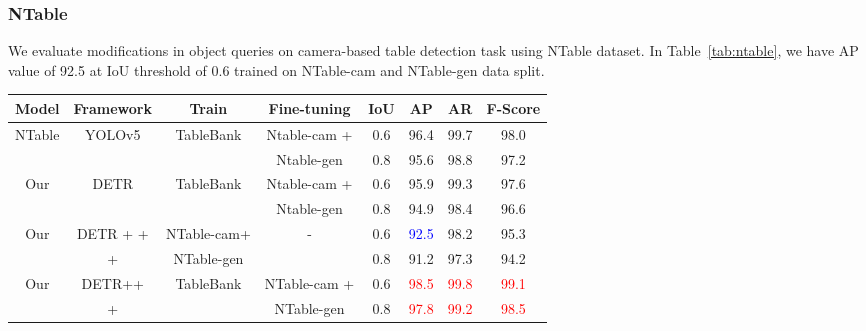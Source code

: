 \documentclass[sn-mathphys]{sn-jnl}\jyear{2021}\theoremstyle{thmstyleone}\newtheorem{theorem}{Theorem}\newtheorem{proposition}[theorem]{Proposition}\theoremstyle{thmstyletwo}\newtheorem{example}{Example}\newtheorem{remark}{Remark}\theoremstyle{thmstylethree}\newtheorem{definition}{Definition}\usepackage{amsmath}
\begin{document}
\subsubsection{NTable}
\label{sec:NTables-result}
We evaluate modifications in object queries on camera-based table detection task using NTable dataset. In Table~\ref{tab:ntable}, we have AP value of 92.5 at IoU threshold of 0.6 trained on NTable-cam and NTable-gen data split. 
\begin{table*}[htp!]
\tiny
\begin{center}
\caption{Comparison between the transformer-based detectors and previous state-of-the-art results on NTable dataset \colorbox{red!25}{without pre-processing} (raw data). Here, term  represents object queries as anchor boxes,  denotes object queries with positive noise and  indicates object queries with negative noise. The best results are exhibited.}\label{tab:ntable}\begin{tabular*}{\textwidth}
{@{\extracolsep{\fill}}cccccccc@{\extracolsep{\fill}}}
\toprule
\textbf{Model} &
\textbf{Framework} &
\textbf{Train} &
\textbf{Fine-tuning} &
\textbf{IoU} &
\textbf{AP} &
\textbf{AR} &
\textbf{F-Score} \\
\midrule

\multirow{2}{*}{NTable \cite{NTables}} & \multirow{2}{*}{YOLOv5} & \multirow{2}{*}{TableBank} & Ntable-cam +  & 0.6 & 96.4 & 99.7 & 98.0 \\
&  &  & Ntable-gen & 0.8 & 95.6 & 98.8 & 97.2\\
\midrule

\multirow{2}{*}{Our} & \multirow{2}{*}{DETR} & \multirow{2}{*}{TableBank} & Ntable-cam +  & 0.6 & 95.9 & 99.3 & 97.6 \\
&  &  & Ntable-gen & 0.8 & 94.9 & 98.4 & 96.6\\
\midrule

\multirow{2}{*}{Our} & DETR + +  & NTable-cam+  & \multirow{2}{*}{-} & 0.6 & \textcolor{blue}{92.5} & 98.2 & 95.3 \\
&  +  & NTable-gen & & 0.8 & 91.2 & 97.3 & 94.2 \\
\midrule

\multirow{2}{*}{Our} & DETR++ & \multirow{2}{*}{TableBank} & NTable-cam +  & 0.6 & \textcolor{red}{98.5} & \textcolor{red}{99.8} & \textcolor{red}{99.1} \\
&  +  &  & NTable-gen & 0.8 & \textcolor{red}{97.8} & \textcolor{red}{99.2} & \textcolor{red}{98.5} \\

\bottomrule
\end{tabular*}
\end{center}
\end{table*}
\end{document}
